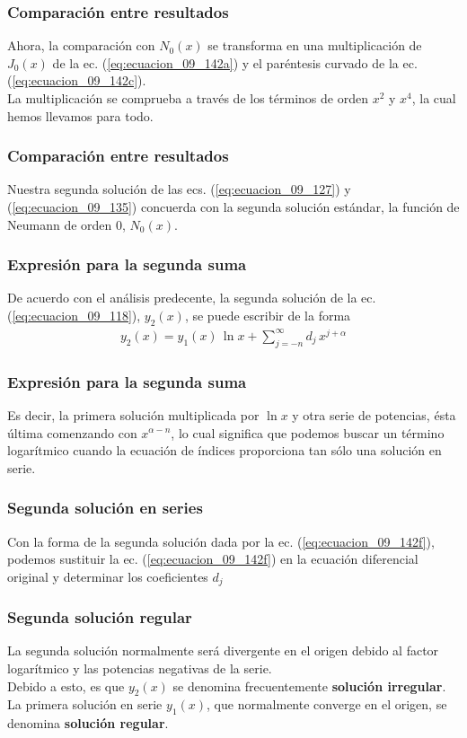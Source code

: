\begin{frame}
\frametitle{Comparación entre resultados}
Ahora, la comparación con $N_{0}(x)$ se transforma en una multiplicación de $J_{0}(x)$ de la ec. (\ref{eq:ecuacion_09_142a}) y el paréntesis curvado de la ec. (\ref{eq:ecuacion_09_142c}).
\\
\bigskip
La multiplicación se comprueba a través de los términos de orden $x^{2}$ y $x^{4}$, la cual hemos llevamos para todo. 
\end{frame}
\begin{frame}
\frametitle{Comparación entre resultados}
Nuestra segunda solución de las ecs. (\ref{eq:ecuacion_09_127}) y (\ref{eq:ecuacion_09_135}) concuerda con la segunda solución estándar, la función de Neumann de orden $0$, $N_{0}(x)$.
\end{frame}
\begin{frame}
\frametitle{Expresión para la segunda suma}
De acuerdo con el análisis predecente, la segunda solución de la ec. (\ref{eq:ecuacion_09_118}), $y_{2}(x)$, se puede escribir de la forma
\begin{align}
y_{2}(x) = y_{1} (x) \, \ln x + \sum_{j=-n}^{\infty} d_{j} \, x^{j+\alpha}
\label{eq:ecuacion_09_142f}
\end{align}
\end{frame}
\begin{frame}
\frametitle{Expresión para la segunda suma}
Es decir, la primera solución multiplicada por $\ln x$ y otra serie de potencias, ésta última comenzando con $x^{\alpha - n}$, lo cual significa que podemos buscar un término logarítmico cuando la ecuación de índices proporciona tan sólo una solución en serie.
\end{frame}
\begin{frame}
\frametitle{Segunda solución en series}
Con la forma de la segunda solución dada por la ec. (\ref{eq:ecuacion_09_142f}), podemos sustituir la ec. (\ref{eq:ecuacion_09_142f}) en la ecuación diferencial original y determinar los coeficientes $d_{j}$
\end{frame}
\begin{frame}
\frametitle{Segunda solución regular}
La segunda solución normalmente será divergente en el origen debido al factor logarítmico y las potencias negativas de la serie. 
\\
\bigskip
Debido a esto, es que $y_{2}(x)$ se denomina frecuentemente \textbf{solución irregular}. La primera solución en serie $y_{1}(x)$, que normalmente converge en el origen, se denomina \textbf{solución regular}.
\end{frame}
